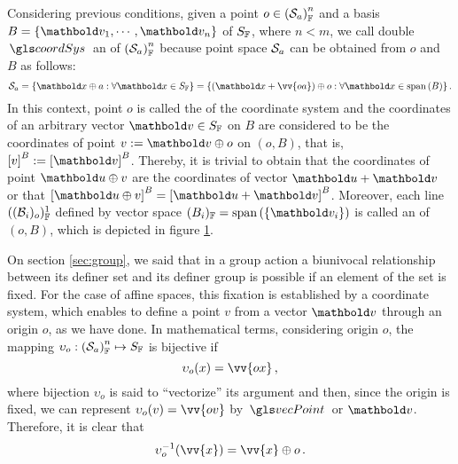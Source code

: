  Considering previous conditions, given a point $o\in\eamsd{S}{F}{a}{n}$ and a basis $B=\{\vto{v}_1,\cdots,\vto{v}_n\}$ of $S_\cam{F}$, where $n<m$, we call double $\gloref{coordSys}$ an  of $\eamsd{S}{F}{a}{n}$ because point space $\epu{S}_a$ can be obtained from $o$ and $B$ as follows:
\begin{equation}\label{eq:pointSpace}
\epu{S}_a=\{\vto{x}\oplus a:\forall \vto{x}\in S_\cam{F}\}= \{(\vto{x}+\vv{oa})\oplus o:\forall \vto{x}\in \spn{(B)}\}\,.
\end{equation}
In this context, point $o$ is called the  of the coordinate system and the coordinates of an arbitrary vector $\vto{v}\in S_\cam{F}$ on $B$ are considered to be the coordinates of point $v:=\vto{v}\oplus o$ on $(o,B)$, that is, $\mav{v}{B}:=\mav{\vto{v}}{B}$. Thereby, it is trivial to obtain that the coordinates of point $\vto{u}\oplus v$ are the coordinates of vector $\vto{u}+\vto{v}$ or that $\mav{\vto{u}\oplus v}{B}=\mav{\vto{u}+\vto{v}}{B}$. Moreover, each line $((\mathcal{B}_i)_o)^1_\cam{F}$ defined by vector space $(B_i)_\cam{F}=\spn{(\{\vto{v}_i\})}$ is called an  of $(o,B)$, which is depicted in figure \ref{fg:coordSystem}.
\begin{figure}[!ht]
	\centering
	\begin{center}
		\scalebox{.72}{}
	\end{center}
	\label{fg:coordSystem}
\end{figure}
On section \ref{sec:group}, we said that in a group action a biunivocal relationship between its definer set and its definer group is possible if an element of the set is fixed. For the case of affine spaces, this fixation is established by a coordinate system, which enables to define a point $v$ from a vector $\vto{v}$ through an origin $o$, as we have done. In mathematical terms, considering origin $o$, the mapping $\map{\upsilon_o}{\eamsd{S}{F}{a}{n}}{S_\cam{F}}$ is bijective if 
\begin{equation}\label{eq:funVect}
\fua{\upsilon_o}{x} = \vv{ox}\,,
\end{equation} 
where bijection $\upsilon_o$ is said to ``vectorize'' its argument and then, since the origin is fixed, we can represent $\fua{\upsilon_o}{v}=\vv{ov}$ by $\gloref{vecPoint}$ or $\vto{v}$. Therefore, it is clear that 
\begin{equation}\label{eq:funVectInv}
\fua{\upsilon_o^{-1}}{\vv{x}} = \vv{x}\oplus o\,.
\end{equation}
